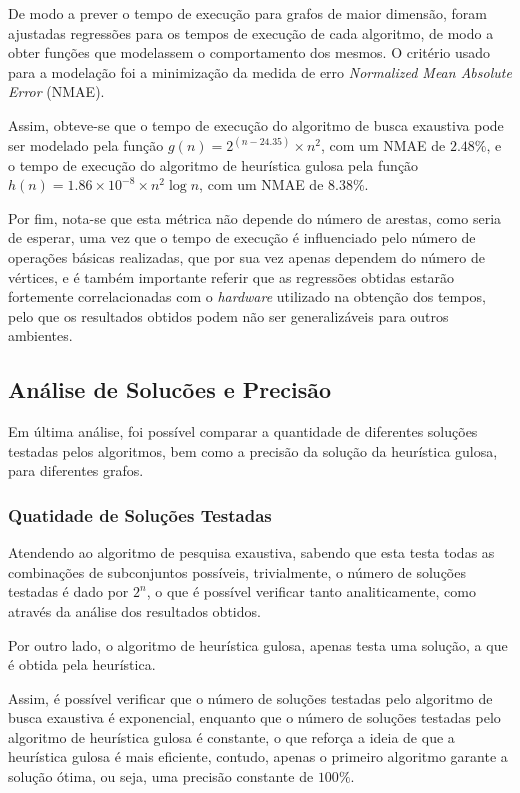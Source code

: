 \documentclass[mirror]{revdetua}
\begin{document}
De modo a prever o tempo de execução para grafos de maior dimensão, foram ajustadas regressões para os tempos de execução de cada algoritmo, de modo a obter funções que modelassem o comportamento dos mesmos. O critério usado para a modelação foi a minimização da medida de erro \textit{Normalized Mean Absolute Error} (NMAE).


Assim, obteve-se que o tempo de execução do algoritmo de busca exaustiva pode ser modelado pela função $g(n) = 2^{(n - 24.35)} \times n^2$, com um NMAE de $2.48\%$, e o tempo de execução do algoritmo de heurística gulosa pela função $h(n) = 1.86 \times 10^{-8} \times n^2 \log n$, com um NMAE de $8.38\%$.

Por fim, nota-se que esta métrica não depende do número de arestas, como seria de esperar, uma vez que o tempo de execução é influenciado pelo número de operações básicas realizadas, que por sua vez apenas dependem do número de vértices, e é também importante referir que as regressões obtidas estarão fortemente correlacionadas com o \textit{hardware} utilizado na obtenção dos tempos, pelo que os resultados obtidos podem não ser generalizáveis para outros ambientes.

\subsection{Análise de Solucões e Precisão}

Em última análise, foi possível comparar a quantidade de diferentes soluções testadas pelos algoritmos, bem como a precisão da solução da heurística gulosa, para diferentes grafos.

\subsubsection{Quatidade de Soluções Testadas}

Atendendo ao algoritmo de pesquisa exaustiva, sabendo que esta testa todas as combinações de subconjuntos possíveis, trivialmente, o número de soluções testadas é dado por $2^n$, o que é possível verificar tanto analiticamente, como através da análise dos resultados obtidos.

Por outro lado, o algoritmo de heurística gulosa, apenas testa uma solução, a que é obtida pela heurística.

Assim, é possível verificar que o número de soluções testadas pelo algoritmo de busca exaustiva é exponencial, enquanto que o número de soluções testadas pelo algoritmo de heurística gulosa é constante, o que reforça a ideia de que a heurística gulosa é mais eficiente, contudo, apenas o primeiro algoritmo garante a solução ótima, ou seja, uma precisão constante de $100\%$.
\end{document}

